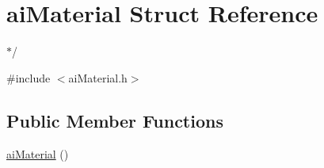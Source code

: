\hypertarget{structai_material}{\section{ai\-Material Struct Reference}
\label{structai_material}
}


$\ast$/  




{\ttfamily \#include $<$ai\-Material.\-h$>$}

\subsection*{Public Member Functions}
\begin{DoxyCompactItemize}
\item 
\hypertarget{structai_material_a3c350f89834a7cd3dbc4b4490a0a09dd}{\hyperlink{structai_material_a3c350f89834a7cd3dbc4b4490a0a09dd}{ai\-Material} ()}\label{structai_material_a3c350f89834a7cd3dbc4b4490a0a09dd}


\end{DoxyCompactItemize}
